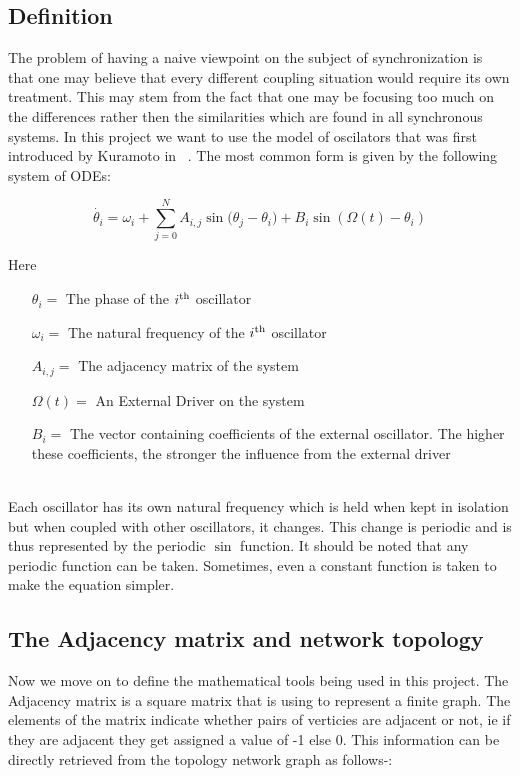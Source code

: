 \label{sec:kuramoto}

\subsection{Definition}
The problem of having a naive viewpoint on the subject of synchronization is that one may believe that every different coupling situation would require its own treatment. This may stem from the fact that one may be focusing too much on the differences rather then the similarities which are found in all synchronous systems.  In this project we want to use the model of oscilators that was first introduced by Kuramoto in ~\cite{book:kura}. The most common form is given by the following system of ODEs:

\[
\dot{\theta_i} = \omega_i + \sum_{j = 0}^{N}{A_{i, j}\sin({\theta_j - \theta_i}}) + B_i \sin(\Omega(t) - \theta_i)\]

Here 
\begin{itemize}
	\item[${\theta_i} = $] The phase of the $i\textsuperscript{th}$ oscillator
	\item[$\omega_i = $] The natural frequency of the $i\textsuperscript{th}$ oscillator
	\item[$A_{i, j} = $] The adjacency matrix of the system
	\item[$\Omega(t) = $] An External Driver on the system
	\item[$B_i = $] The vector containing coefficients of the external oscillator. The higher these coefficients, the stronger the influence from the external driver
\end{itemize}
~\\
Each oscillator has its own natural frequency which is held when kept in isolation but when coupled with other oscillators, it changes. This change is periodic and is thus represented by the periodic $\sin$ function. It should be noted that any periodic function can be taken. Sometimes, even a constant function is taken to make the equation simpler.

\subsection{The Adjacency matrix and network topology}


Now we move on to define the mathematical tools being used in this project. The Adjacency matrix is a square matrix that is using to represent a finite graph. The elements of the matrix indicate whether pairs of verticies are adjacent or not, ie if they are adjacent they get assigned a value of -1 else 0. This information can be directly retrieved from the topology network graph as follows-:

